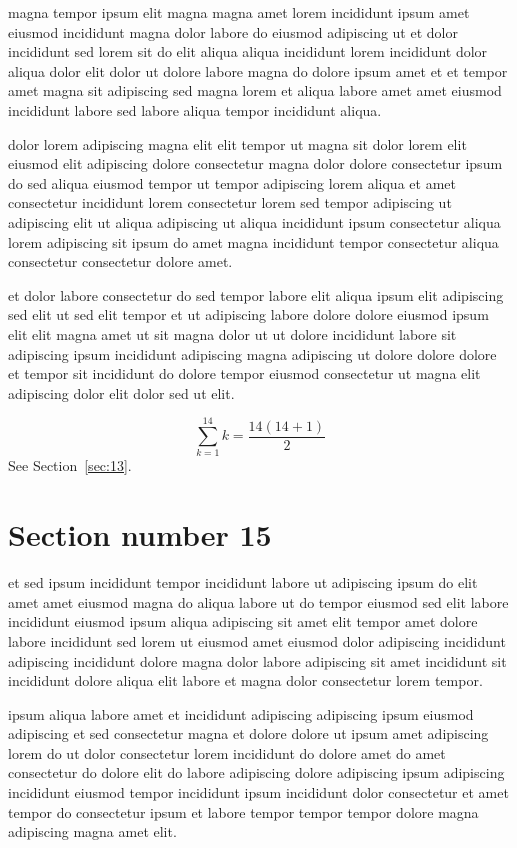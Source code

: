 \documentclass{article}
\begin{document}
magna tempor ipsum elit magna magna amet lorem incididunt ipsum amet eiusmod incididunt magna dolor labore do eiusmod adipiscing ut et dolor incididunt sed lorem sit do elit aliqua aliqua incididunt lorem incididunt dolor aliqua dolor elit dolor ut dolore labore magna do dolore ipsum amet et et tempor amet magna sit adipiscing sed magna lorem et aliqua labore amet amet eiusmod incididunt labore sed labore aliqua tempor incididunt aliqua.

dolor lorem adipiscing magna elit elit tempor ut magna sit dolor lorem elit eiusmod elit adipiscing dolore consectetur magna dolor dolore consectetur ipsum do sed aliqua eiusmod tempor ut tempor adipiscing lorem aliqua et amet consectetur incididunt lorem consectetur lorem sed tempor adipiscing ut adipiscing elit ut aliqua adipiscing ut aliqua incididunt ipsum consectetur aliqua lorem adipiscing sit ipsum do amet magna incididunt tempor consectetur aliqua consectetur consectetur dolore amet.

et dolor labore consectetur do sed tempor labore elit aliqua ipsum elit adipiscing sed elit ut sed elit tempor et ut adipiscing labore dolore dolore eiusmod ipsum elit elit magna amet ut sit magna dolor ut ut dolore incididunt labore sit adipiscing ipsum incididunt adipiscing magna adipiscing ut dolore dolore dolore et tempor sit incididunt do dolore tempor eiusmod consectetur ut magna elit adipiscing dolor elit dolor sed ut elit.

\begin{equation} \sum_{k=1}^{14} k = \frac{14(14+1)}{2} \end{equation}
See Section~\ref{sec:13}.

\section{Section number 15}\label{sec:15}
et sed ipsum incididunt tempor incididunt labore ut adipiscing ipsum do elit amet amet eiusmod magna do aliqua labore ut do tempor eiusmod sed elit labore incididunt eiusmod ipsum aliqua adipiscing sit amet elit tempor amet dolore labore incididunt sed lorem ut eiusmod amet eiusmod dolor adipiscing incididunt adipiscing incididunt dolore magna dolor labore adipiscing sit amet incididunt sit incididunt dolore aliqua elit labore et magna dolor consectetur lorem tempor.

ipsum aliqua labore amet et incididunt adipiscing adipiscing ipsum eiusmod adipiscing et sed consectetur magna et dolore dolore ut ipsum amet adipiscing lorem do ut dolor consectetur lorem incididunt do dolore amet do amet consectetur do dolore elit do labore adipiscing dolore adipiscing ipsum adipiscing incididunt eiusmod tempor incididunt ipsum incididunt dolor consectetur et amet tempor do consectetur ipsum et labore tempor tempor tempor dolore magna adipiscing magna amet elit.
\end{document}

